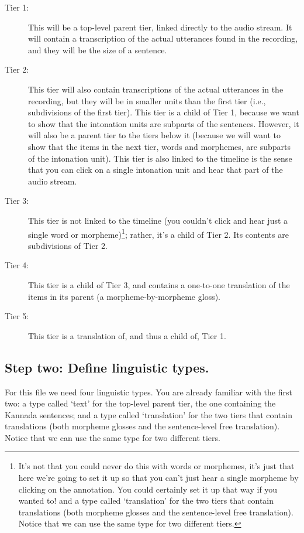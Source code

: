 \documentclass[letterpaper,12pt]{article}
\begin{document}
\begin{description}
\item[Tier 1:] This will be a top-level parent tier, linked directly to the audio stream. It will contain a transcription of the actual utterances found in the recording, and they will be the size of a sentence.
\item[Tier 2:] This tier will also contain transcriptions of the actual utterances in the recording, but they will be in smaller units than the first tier (i.e., subdivisions of the first tier). This tier is a child of Tier 1, because we want to show that the intonation units are subparts of the sentences. However, it will also be a parent tier to the tiers below it (because we will want to show that the items in the next tier, words and morphemes, are subparts of the intonation unit). This tier is also linked to the timeline is the sense that you can click on a single intonation unit and hear that part of the audio stream.
\item[Tier 3:] This tier is not linked to the timeline (you couldn't click and hear just a single word or morpheme)\footnote{It's not that you could never do this with words or morphemes, it's just that here we're going to set it up so that you can't just hear a single morpheme by clicking on the annotation. You could certainly set it up that way if you wanted to! and a type called `translation' for the two tiers that contain translations (both morpheme glosses and the sentence-level free translation). Notice that we can use the same type for two different tiers.}; rather, it's a child of Tier 2. Its contents are subdivisions of Tier 2.
\item[Tier 4:] This tier is a child of Tier 3, and contains a one-to-one translation of the items in its parent (a morpheme-by-morpheme gloss).
\item[Tier 5:] This tier is a translation of, and thus a child of, Tier 1.
\end{description}

\subsection*{Step two: Define linguistic types.}
For this file we need four linguistic types. You are already familiar with the first two: a type called `text' for the top-level parent tier, the one containing the Kannada sentences; and a type called `translation' for the two tiers that contain translations (both morpheme glosses and the sentence-level free translation). Notice that we can use the same type for two different tiers.
\end{document}
